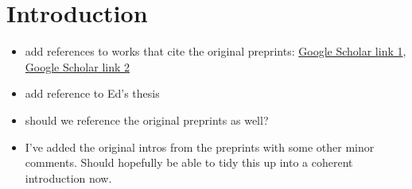 \documentclass{amsart}
\begin{document}
\section{Introduction}
\begin{itemize}
\item add references to works that cite the original preprints: \href{https://scholar.google.com/scholar?oi=bibs\&hl=en\&cites=3135675589124701435}{Google Scholar link 1}, \href{https://scholar.google.com/scholar?oi=bibs&hl=en&cites=13749645182111219012&as_sdt=5}{Google Scholar link 2}
\item add reference to Ed's thesis
\item should we reference the original preprints as well?
\item I've added the original intros from the preprints with some other minor comments. Should hopefully be able to tidy this up into a coherent introduction now.

\end{itemize}
\end{document}
